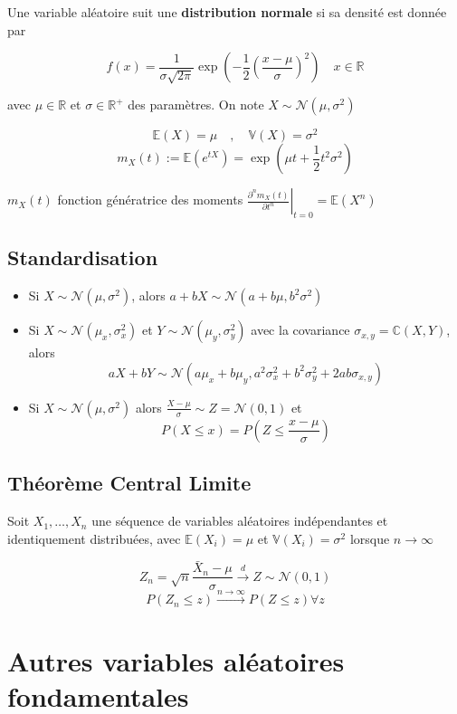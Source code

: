 \documentclass[12pt,a4paper]{article}
\begin{document}
Une variable aléatoire suit une \textbf{distribution normale} si sa densité est donnée par

$$f(x) = \frac{1}{\sigma\sqrt{2\pi}} \exp\left(-\frac{1}{2}\left(\frac{x - \mu}{\sigma}\right)^2\right) \quad x \in \mathbb{R}$$

avec $\mu \in \mathbb{R}$ et $\sigma \in \mathbb{R}^+$ des paramètres. On note $X \sim \mathcal{N}(\mu,\sigma^2)$

$$\mathbb{E}(X) = \mu \quad , \quad \mathbb{V}(X) = \sigma^2$$
$$m_X(t) := \mathbb{E}\left(e^{tX}\right) = \exp\left(\mu t + \frac{1}{2}t^2\sigma^2\right)$$

$m_X(t)$ fonction génératrice des moments $\left.\frac{\partial^n m_X(t)}{\partial t^n}\right|_{t=0} = \mathbb{E}(X^n)$

\subsection{Standardisation}

\begin{itemize}
    \item Si $X \sim \mathcal{N}(\mu,\sigma^2)$, alors $a + bX \sim \mathcal{N}(a + b\mu, b^2\sigma^2)$
    \item Si $X \sim \mathcal{N}(\mu_x,\sigma_x^2)$ et $Y \sim \mathcal{N}(\mu_y,\sigma_y^2)$ avec la covariance $\sigma_{x,y} = \mathbb{C}(X,Y)$, alors
    $$aX + bY \sim \mathcal{N}(a\mu_x + b\mu_y, a^2 \sigma_x^2 + b^2 \sigma_y^2 + 2ab\sigma_{x,y})$$
    \item Si $X \sim \mathcal{N}(\mu,\sigma^2)$ alors $\frac{X - \mu}{\sigma} \sim Z = \mathcal{N}(0,1)$ et
    $$P(X \leq x) = P\left(Z \leq \frac{x - \mu}{\sigma}\right)$$
\end{itemize}

\subsection{Théorème Central Limite}

Soit $X_1, \dots, X_n$ une séquence de variables aléatoires indépendantes et identiquement distribuées, avec $\mathbb{E}(X_i) = \mu$ et $\mathbb{V}(X_i) = \sigma^2$ lorsque $n\rightarrow \infty$

$$
Z_n = \sqrt{n} \frac{\bar{X}_n - \mu}{\sigma} \xrightarrow{d} Z \sim \mathcal{N}(0,1)
$$
$$
P(Z_n \leq z) \xrightarrow{n \to \infty} P(Z \leq z) \forall z
$$


\break

\section{Autres variables aléatoires fondamentales}
\end{document}
